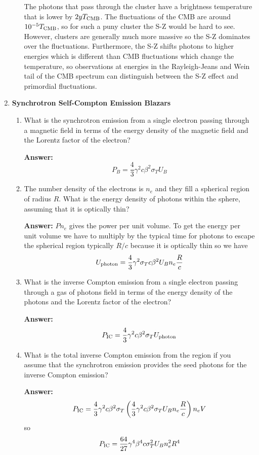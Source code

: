 \documentclass{article}
\newcommand{\rmscr}[1]{{\hbox{\rm \scriptsize #1}}}
\begin{document}
\begin{enumerate}
\begin{enumerate}
The photons that pass through the cluster have a brightness
temperature that is lower by $2y T_\rmscr{CMB}$.
The fluctuations of the CMB are around $10^{-5} T_\rmscr{CMB}$, so for
such a puny cluster the S-Z would be hard to see.  However, clusters
are generally much more massive so the S-Z dominates over the
fluctuations.  Furthermore, the S-Z shifts photons to higher energies
which is different than CMB fluctuations which change the temperature,
so observations at energies in the Rayleigh-Jeans and Wein tail of the
CMB spectrum can distinguish between the S-Z effect and primordial
fluctuations. 
\end{enumerate}

\item{\bf Synchrotron Self-Compton Emission Blazars}

\begin{enumerate}
\item
What is the synchrotron emission from a single electron passing
through a magnetic field in terms of the energy density of the
magnetic field and the Lorentz factor of the electron?

{\bf Answer:}
\begin{equation}
P_B = \frac{4}{3} \gamma^2 c \beta^2 \sigma_T U_B
\end{equation}
\item 
The number density of the electrons is $n_e$ and they fill a
spherical region of radius $R$.  What is the energy density of photons
within the sphere, assuming that it is optically thin?

{\bf Answer:}
$P n_e$ gives the power per unit volume.  To get the energy per unit
volume we have to multiply by the typical time for photons to escape the
spherical region typically $R/c$ because it is optically thin so we have
\begin{equation}
U_\rmscr{photon} = \frac{4}{3} \gamma^2 \sigma_T c \beta^2 U_B n_e \frac{R}{c}
\end{equation}
\item
What is the inverse Compton emission from a single electron passing
through a gas of photons field in terms of the energy density of the
photons and the Lorentz factor of the electron?

{\bf Answer:}
\begin{equation}
P_\rmscr{IC} = \frac{4}{3} \gamma^2 c \beta^2 \sigma_T U_\rmscr{photon}
\end{equation}
\item
What is the total inverse Compton emission from the region if you
assume that the synchrotron emission provides the seed photons for the
inverse Compton emission?  

{\bf Answer:}
\begin{equation}
P_\rmscr{IC} = \frac{4}{3} \gamma^2 c \beta^2 \sigma_T \left ( 
\frac{4}{3} \gamma^2 c \beta^2 \sigma_T U_B n_e \frac{R}{c} \right
) n_e V
\end{equation}
so
\begin{equation}
P_\rmscr{IC} = \frac{64}{27} \gamma^4 \beta^4 c \sigma_T^2
U_B n_e^2 R^4
\end{equation}

\end{enumerate}
\end{enumerate}
\ifx\bookloaded\undefined
\end{document}
